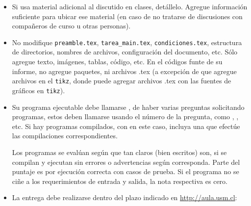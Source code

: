 \begin{itemize}
  \item
    Si usa material adicional al discutido en clases,
    detállelo.
    Agregue información suficiente para ubicar ese material
    (en caso de no tratarse de discusiones con compañeros de curso
     u otras personas).
  \item No modifique \texttt{preamble.tex}, \texttt{tarea\_main.tex}, \texttt{condiciones.tex}, estructura de directorios, nombres de archivos, configuración del documento, etc. Sólo agregue texto, imágenes, tablas, código, etc. En el códigos funte de su informe, no agregue paquetes, ni archivos .tex (a excepción de que agregue archivos en el \texttt{tikz}, donde puede agregar archivos .tex con las fuentes de gráficos en \texttt{tikz}).
\ifprograms
  \item
    Su programa ejecutable debe llamarse ,
    de haber varias preguntas solicitando programas,
    estos deben llamarse usando el número de la pregunta,
    como ,
    ,
    etc.
    Si hay programas compilados, con en este caso,
    incluya una 
    que efectúe las compilaciones correspondientes.

    Los programas se evalúan según que tan claros
    (bien escritos)
    son, si se compilan y ejecutan sin errores o advertencias según corresponda.
    Parte del puntaje es por ejecución correcta con casos de prueba.
    Si el programa no se ciñe a los requerimientos de entrada y salida,
    la nota respectiva es cero.
\fi    
  \item
    La entrega debe realizarse dentro del plazo indicado en \url{http://aula.usm.cl}:


\end{itemize}
